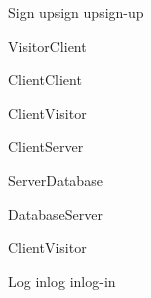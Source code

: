 \begin{sdfig}{Sign up}{sign up}{sign-up}
\begin{umlcall}[op={Sign up}]{Visitor}{Client}
\begin{umlcall}[op={Validate}]{Client}{Client}
\begin{umlfragment}[type=alt, label=valid]
\begin{umlcall}[type=return,op={Loading}]{Client}{Visitor}
\begin{umlcall}[op={Sign up}]{Client}{Server}
\begin{umlcall}[op={Has user}]{Server}{Database}
\begin{umlfragment}[type=alt, label=true]
\begin{umlcall}[type=return,op={No}]{Database}{Server}
                \end{umlcall}
              \end{umlfragment}
            \end{umlcall}
          \end{umlcall}
        \end{umlcall}
        \umlfpart[else]
        \begin{umlcall}[type=return,op={Error}]{Client}{Visitor}
        \end{umlcall}
      \end{umlfragment}
    \end{umlcall}
  \end{umlcall}
\end{sdfig}


\begin{sdfig}{Log in}{log in}{log-in}


\end{sdfig}
